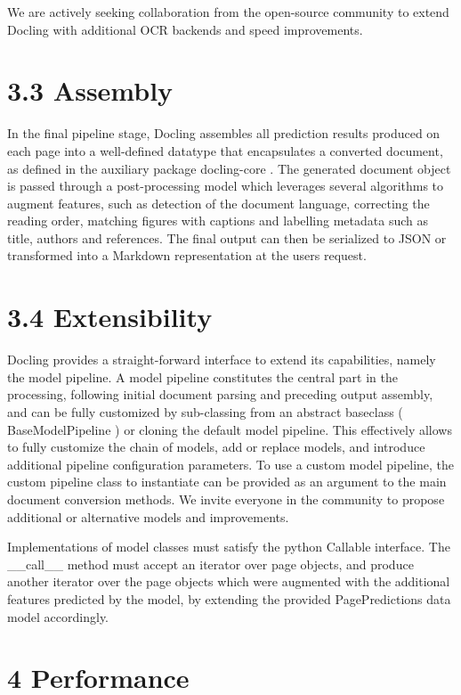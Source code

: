 \documentclass[11pt,a4paper]{article}
\begin{document}
We are actively seeking collaboration from the open-source community to extend Docling with additional OCR backends and speed improvements.

\section{3.3 Assembly}

In the final pipeline stage, Docling assembles all prediction results produced on each page into a well-defined datatype that encapsulates a converted document, as defined in the auxiliary package docling-core . The generated document object is passed through a post-processing model which leverages several algorithms to augment features, such as detection of the document language, correcting the reading order, matching figures with captions and labelling metadata such as title, authors and references. The final output can then be serialized to JSON or transformed into a Markdown representation at the users request.

\section{3.4 Extensibility}

Docling provides a straight-forward interface to extend its capabilities, namely the model pipeline. A model pipeline constitutes the central part in the processing, following initial document parsing and preceding output assembly, and can be fully customized by sub-classing from an abstract baseclass ( BaseModelPipeline ) or cloning the default model pipeline. This effectively allows to fully customize the chain of models, add or replace models, and introduce additional pipeline configuration parameters. To use a custom model pipeline, the custom pipeline class to instantiate can be provided as an argument to the main document conversion methods. We invite everyone in the community to propose additional or alternative models and improvements.

Implementations of model classes must satisfy the python Callable interface. The \_\_call\_\_ method must accept an iterator over page objects, and produce another iterator over the page objects which were augmented with the additional features predicted by the model, by extending the provided PagePredictions data model accordingly.

\section{4 Performance}
\end{document}
